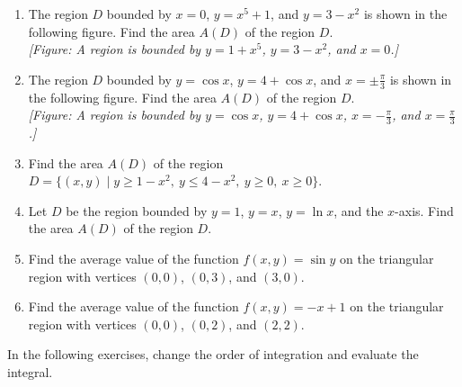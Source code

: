 \documentclass{exercises}
\begin{document}
\begin{enumerate}[resume]
\begin{enumerate}[label=(\alph*)]
  \item Show that $\underset{D}{\iint}x\,dA=\int_{0}^{1}\,\int_{-y}^{\sqrt{y}}x\,dx\,dy+\int_{1}^{4}\,\int_{y-2}^{\sqrt{y}}x\,dx\,dy$ by dividing the region $D$ into two regions of Type II, where $D=\{(x,y)\mid y\ge x^{2},\ y\ge -x,\ y\le x+2\}$.
  \item Evaluate the integral $\underset{D}{\iint}x\,dA$.
\end{enumerate}
\item The region $D$ bounded by $x=0$, $y=x^{5}+1$, and $y=3-x^{2}$ is shown in the following figure. Find the area $A(D)$ of the region $D$. \\ \textit{[Figure: A region is bounded by $y=1+x^5$, $y=3-x^2$, and $x=0$.]}
\item The region $D$ bounded by $y=\cos x$, $y=4+\cos x$, and $x=\pm \frac{\pi}{3}$ is shown in the following figure. Find the area $A(D)$ of the region $D$. \\ \textit{[Figure: A region is bounded by $y=\cos x$, $y=4+\cos x$, $x=-\frac{\pi}{3}$, and $x=\frac{\pi}{3}$.]}
\item Find the area $A(D)$ of the region $D=\{(x,y)\mid y\ge 1-x^{2},\ y\le 4-x^{2},\ y\ge 0,\ x\ge 0\}$.
\item Let $D$ be the region bounded by $y=1$, $y=x$, $y=\ln x$, and the $x$-axis. Find the area $A(D)$ of the region $D$.
\item Find the average value of the function $f(x,y)=\sin y$ on the triangular region with vertices $(0,0)$, $(0,3)$, and $(3,0)$.
\item Find the average value of the function $f(x,y)=-x+1$ on the triangular region with vertices $(0,0)$, $(0,2)$, and $(2,2)$.
\end{enumerate}

In the following exercises, change the order of integration and evaluate the integral.
\end{document}
